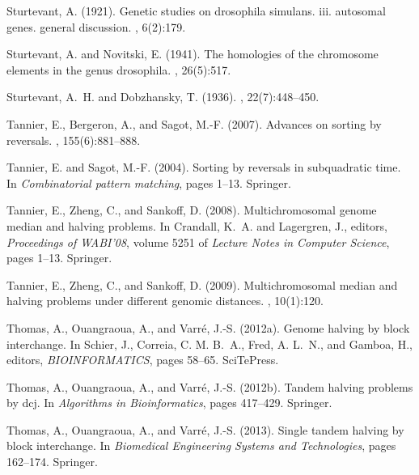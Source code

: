 \documentclass[11pt,final,twoside,nofrench]{thlifl}
\begin{document}
\begin{thebibliography}{}
Sturtevant, A. (1921).
\newblock Genetic studies on drosophila simulans. iii. autosomal genes. general
  discussion.
, 6(2):179.

Sturtevant, A. and Novitski, E. (1941).
\newblock The homologies of the chromosome elements in the genus drosophila.
, 26(5):517.

Sturtevant, A.~H. and Dobzhansky, T. (1936).
, 22(7):448--450.

Tannier, E., Bergeron, A., and Sagot, M.-F. (2007).
\newblock Advances on sorting by reversals.
, 155(6):881--888.

Tannier, E. and Sagot, M.-F. (2004).
\newblock Sorting by reversals in subquadratic time.
\newblock In {\em Combinatorial pattern matching}, pages 1--13. Springer.

Tannier, E., Zheng, C., and Sankoff, D. (2008).
\newblock Multichromosomal genome median and halving problems.
\newblock In Crandall, K.~A. and Lagergren, J., editors, {\em Proceedings of
  WABI'08}, volume 5251 of {\em Lecture Notes in Computer Science}, pages
  1--13. Springer.

Tannier, E., Zheng, C., and Sankoff, D. (2009).
\newblock Multichromosomal median and halving problems under different genomic
  distances.
, 10(1):120.

Thomas, A., Ouangraoua, A., and Varré, J.-S. (2012a).
\newblock Genome halving by block interchange.
\newblock In Schier, J., Correia, C. M. B.~A., Fred, A. L.~N., and Gamboa, H.,
  editors, {\em BIOINFORMATICS}, pages 58--65. SciTePress.

Thomas, A., Ouangraoua, A., and Varr{\'e}, J.-S. (2012b).
\newblock Tandem halving problems by dcj.
\newblock In {\em Algorithms in Bioinformatics}, pages 417--429. Springer.

Thomas, A., Ouangraoua, A., and Varr{\'e}, J.-S. (2013).
\newblock Single tandem halving by block interchange.
\newblock In {\em Biomedical Engineering Systems and Technologies}, pages
  162--174. Springer.


\end{thebibliography}
\end{document}
